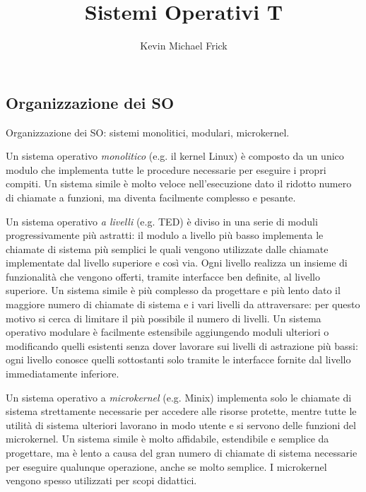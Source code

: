 \documentclass[answers,a4paper,12pt]{exam}
\title{Sistemi Operativi T}
\author{Kevin Michael Frick}
\begin{document}
\maketitle
\begin{questions}
\section{Organizzazione dei SO}
\question
Organizzazione dei SO: sistemi monolitici, modulari, microkernel.
\begin{solutionorlines}
Un sistema operativo \textit{monolitico} (e.g. il kernel Linux) è composto da un unico modulo che implementa tutte le procedure necessarie per eseguire i propri compiti. Un sistema simile è molto veloce nell'esecuzione dato il ridotto numero di chiamate a funzioni, ma diventa facilmente complesso e pesante.

Un sistema operativo \textit{a livelli} (e.g. TED) è diviso in una serie di moduli progressivamente più astratti: il modulo a livello più basso implementa le chiamate di sistema più semplici le quali vengono utilizzate dalle chiamate implementate dal livello superiore e così via. Ogni livello realizza un insieme di funzionalità che vengono offerti, tramite interfacce  ben definite, al livello superiore. Un sistema simile è più complesso da progettare e più lento dato il maggiore numero di chiamate di sistema e i vari livelli da attraversare: per questo motivo si cerca di limitare il più possibile il numero di livelli. Un sistema operativo modulare è facilmente estensibile aggiungendo moduli ulteriori o modificando quelli esistenti senza dover lavorare sui livelli di astrazione più bassi: ogni livello conosce quelli sottostanti solo tramite le interfacce fornite dal livello immediatamente inferiore.

Un sistema operativo a \textit{microkernel} (e.g. Minix) implementa solo le chiamate di sistema strettamente necessarie per accedere alle risorse protette, mentre tutte le utilità di sistema ulteriori lavorano in modo utente e si servono delle funzioni del microkernel. Un sistema simile è molto affidabile, estendibile e semplice da progettare, ma è lento a causa del gran numero di chiamate di sistema necessarie per eseguire qualunque operazione, anche se molto semplice. I microkernel vengono spesso utilizzati per scopi didattici.
\end{solutionorlines}

\end{questions}
\end{document}
